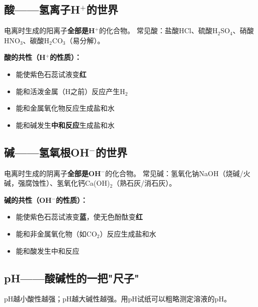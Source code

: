 \documentclass[a4paper,12pt]{ctexart}
\newenvironment{definition}[1]{\vspace{0.2cm}\begin{center}\begin{minipage}{0.88\textwidth}\fbox{\begin{minipage}{0.92\textwidth}\vspace{0.1cm}\textbf{\textcolor{defblue}{【 #1 】}}}{\vspace{0.1cm}\end{minipage}}\end{minipage}\end{center}\vspace{0.2cm}}
\newcommand{\formula}[1]{\begin{center}\textcolor{formulared}{\large\boxed{#1}}\end{center}}
\begin{document}
\subsection*{酸——氢离子H$^+$的世界}

\begin{definition}{酸}
电离时生成的阳离子\textbf{全部是H$^+$}的化合物。
\end{definition}

\textbf{常见酸：}盐酸HCl、硫酸H$_2$SO$_4$、硝酸HNO$_3$、碳酸H$_2$CO$_3$（易分解）。

\textbf{酸的共性（H$^+$的性质）：}
\begin{itemize}
  \item 能使紫色石蕊试液变\textbf{红}
  \item 能和活泼金属（H之前）反应产生H$_2$
  \item 能和金属氧化物反应生成盐和水
  \item 能和碱发生\textbf{中和反应}生成盐和水
\end{itemize}

\subsection*{碱——氢氧根OH$^-$的世界}

\begin{definition}{碱}
电离时生成的阴离子\textbf{全部是OH$^-$}的化合物。
\end{definition}

\textbf{常见碱：}氢氧化钠NaOH（烧碱/火碱，强腐蚀性）、氢氧化钙Ca(OH)$_2$（熟石灰/消石灰）。

\textbf{碱的共性（OH$^-$的性质）：}
\begin{itemize}
  \item 能使紫色石蕊试液变\textbf{蓝}，使无色酚酞变\textbf{红}
  \item 能和非金属氧化物（如CO$_2$）反应生成盐和水
  \item 能和酸发生中和反应
\end{itemize}

\subsection*{pH——酸碱性的一把"尺子"}


pH越小酸性越强；pH越大碱性越强。用pH试纸可以粗略测定溶液的pH。
\end{document}
